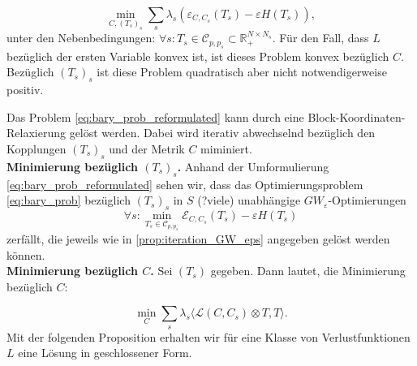 \documentclass[11pt,a4paper]{article}
\numberwithin{equation}{section}
\begin{document}
	\begin{equation}
	\min_{C,(T_s)_s}{\sum_s{\lambda_s(\varepsilon_{C,C_s}(T_s) - \varepsilon H(T_s))}}, \label{eq:bary_prob_reformulated} 
	\end{equation}
	unter den Nebenbedingungen: $ \forall s: T_s \in \mathcal{C}_{p,p_s} \subset \mathbb{R}_{+}^{N \times N_s}$.
	Für den Fall, dass $L$ bezüglich der ersten Variable konvex ist, ist dieses Problem konvex bezüglich $C$. Bezüglich $(T_s)_s$ ist diese Problem quadratisch aber nicht notwendigerweise positiv.
	
	Das Problem \autoref{eq:bary_prob_reformulated} kann durch eine Block-Koordinaten-Relaxierung gelöst werden. Dabei wird iterativ abwechselnd bezüglich den Kopplungen $(T_s)_s$ und der Metrik $C$ miminiert.\\
	
	\noindent \textbf{Minimierung bezüglich $(T_s)_s$.}
	Anhand der Umformulierung \autoref{eq:bary_prob_reformulated} sehen wir, dass das Optimierungsproblem \autoref{eq:bary_prob} bezüglich $(T_s)_s$ in $S$ (?viele) unabhängige $GW_\varepsilon$-Optimierungen
	\begin{equation}
	\forall s : \min_{T_s \in \mathcal{C}_{p, p_s}}{\mathcal{E}_{C,C_s}(T_s)- \varepsilon H(T_s)}
	\end{equation}
	zerfällt, die jeweils wie in \autoref{prop:iteration_GW_eps} angegeben gelöst werden können.\\
	
	\noindent \textbf{Minimierung bezüglich $C$.} Sei $(T_s)$ gegeben. Dann lautet, die Minimierung bezüglich $C$:
	
	\begin{equation}
	\min_C \sum_s{\lambda_s \langle \mathcal{L}(C,C_s) \otimes T,T \rangle}. \label{eq:minimierung_C}
	\end{equation}
	Mit der folgenden Proposition erhalten wir für eine Klasse von Verlustfunktionen $L$ eine Lösung in geschlossener Form.
	
\end{document}
